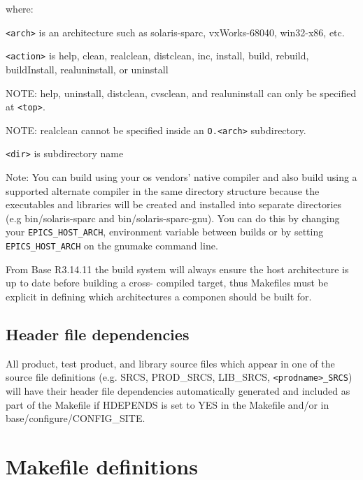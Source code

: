 where: 

\begin{description}
\item \verb|<arch>| is an architecture such as solaris-sparc, vxWorks-68040, win32-x86, etc.

\item \verb|<action>| is help, clean, realclean, distclean, inc, install, build, rebuild, buildInstall, realuninstall, or uninstall

\item NOTE: help, uninstall, distclean, cvsclean, and realuninstall can only be specified at \verb|<top>|.

\item NOTE: realclean cannot be specified inside an \verb|O.<arch>| subdirectory.

\item \verb|<dir>| is subdirectory name

\end{description}

Note: You can build using your os vendors' native compiler and also build using a supported alternate compiler in the 
same directory structure because the executables and libraries will be created and installed into separate directories (e.g 
bin/solaris-sparc and bin/solaris-sparc-gnu). You can do this by changing your \verb|EPICS_HOST_ARCH|, environment 
variable between builds or by setting \verb|EPICS_HOST_ARCH| on the gnumake command line.

From Base R3.14.11 the build system will always ensure the host architecture is up to date before building a cross-
compiled target, thus Makefiles must be explicit in defining which architectures a componen should be built for.

\subsection{Header file dependencies}

All product, test product, and library source files which appear in one of the source file definitions (e.g. SRCS, 
PROD\_SRCS, LIB\_SRCS, \verb|<prodname>_SRCS|) will have their header file dependencies automatically generated and 
included as part of the Makefile if HDEPENDS is set to YES in the Makefile and/or in base/configure/CONFIG\_SITE.

\section{Makefile definitions}

